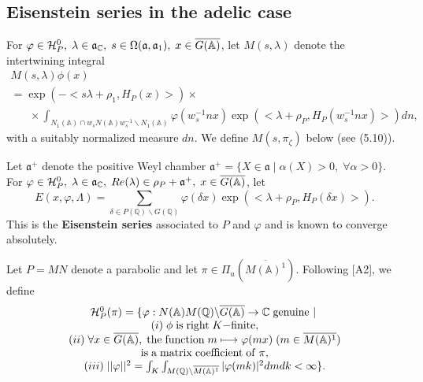 \subsection{Eisenstein series in the adelic case}

For $\varphi \in {\cal H}_P^0,\;\lambda \in {\mathfrak{a}}_{{\mathbb C}},\;s\in
\Omega ({\mathfrak{a}},{\mathfrak{a}}_1),\;x\in \overline{G({\mathbb{A}})}$, let
$M(s,\lambda)$ denote the intertwining integral
\begin{equation}
\begin{array}{c}
M(s,\lambda )\phi(x) \\ 
=\exp (-<s\lambda +\rho _1,H_P(x)>)\times \;\;\;\;\;\;\;\;\;\;\;\;\; \\ 
\;\;\;\;\;\;\times
\int_{N_1({\mathbb{A}})\cap w_sN({\mathbb{A}})w_s^{-1}\backslash
N_1({\mathbb{A}})}\varphi (w_s^{-1}nx)
\exp (<\lambda +\rho_P,H_P(w_s^{-1}nx)>)dn,
\end{array}
\end{equation}
with a suitably normalized measure $dn$.
We define $M(s,\pi_\zeta)$ below (see (5.10)).

Let ${\mathfrak{a}}^{+}$ denote the positive Weyl chamber ${\mathfrak{a}}^{+}=\{X\in 
{\mathfrak{a}}\;|\;\alpha (X)>0,\;\forall \alpha >0\}$.
For $\varphi \in {\cal{H}}_P^0,
\;\lambda \in {\mathfrak{a}}_{{\mathbb C}},
\;Re(\lambda )\in \rho _P+{\mathfrak{a}}^{+},
\;x\in \overline{G({\mathbb{A}})}$, let 
\begin{equation}
E(x,\varphi ,\Lambda )=
\sum_{\delta \in P({\mathbb{Q}})\backslash G({\mathbb{Q}})}
\varphi (\delta x)\exp (<\lambda +\rho _P,H_P(\delta x)>).
\end{equation}
This is the {\bf Eisenstein series} associated to $P$ and $\varphi $ and is
known to converge absolutely. 

Let $P=MN$ denote a parabolic and let
$\pi \in \Pi _u(\overline{M({\mathbb{A}})^1})$.
Following [A2], we define 
\begin{equation}
\begin{array}{c}
{\cal H}_P^0(\pi )=\{\varphi :N({\mathbb{A}})M({\mathbb{Q}})
\backslash \overline{G({\mathbb{A}})}\rightarrow {\mathbb C}\;
{\rm genuine\ }|\; \\ 
(i)\;\phi \;{\rm is\;right}\;K{\rm -finite,} \\ 
(ii)\;\forall x\in \overline{G({\mathbb{A}})},
\;{\rm the\;function}\;m\longmapsto \varphi (mx)
\;(m\in \overline{M({{\mathbb{A}}})^1}) \\ 
{\rm is\;a\;matrix\;coefficient\;of}\;\pi , \\ 
(iii)\;||\varphi ||^2
=\int_K\int_{M({\mathbb{Q}})\backslash \overline{M({\mathbb{A}})^1}}|
\varphi (mk)|^2dmdk<\infty \}.
\end{array}
\end{equation}

